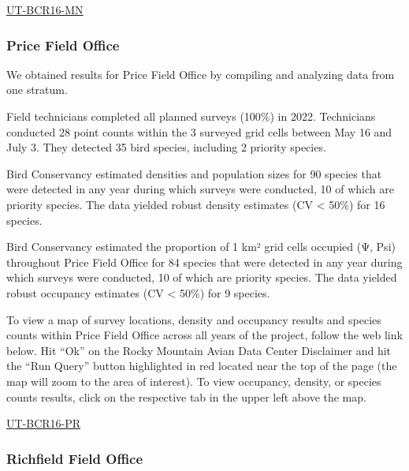 \documentclass[
  letterpaper,
  DIV=11,
  numbers=noendperiod,
  oneside]{scrreprt}
\begin{document}
\href{http://www.rmbo.org/new_site/adc/QueryWindow.aspx\#N4IgzgLgTghhCuBbEAuABCAqgFQLQCEBhAJQEYA2XAWQDl194oBTGeNAewDM0AZGAOwAmaKgJgBzJoib8IaXCPayAlgGMmAGw3s0AMWWbhAeU6c1TEAF8gA=}{UT-BCR16-MN}

\hypertarget{price-field-office}{%
\subsubsection{Price Field Office}\label{price-field-office}}

We obtained results for Price Field Office by compiling and analyzing
data from one stratum.

Field technicians completed all planned surveys (100\%) in 2022.
Technicians conducted 28 point counts within the 3 surveyed grid cells
between May 16 and July 3. They detected 35 bird species, including 2
priority species.

Bird Conservancy estimated densities and population sizes for 90 species
that were detected in any year during which surveys were conducted, 10
of which are priority species. The data yielded robust density estimates
(CV \textless{} 50\%) for 16 species.

Bird Conservancy estimated the proportion of 1 km² grid cells occupied
(Ψ, Psi) throughout Price Field Office for 84 species that were detected
in any year during which surveys were conducted, 10 of which are
priority species. The data yielded robust occupancy estimates (CV
\textless{} 50\%) for 9 species.

To view a map of survey locations, density and occupancy results and
species counts within Price Field Office across all years of the
project, follow the web link below. Hit ``Ok'' on the Rocky Mountain
Avian Data Center Disclaimer and hit the ``Run Query'' button
highlighted in red located near the top of the page (the map will zoom
to the area of interest). To view occupancy, density, or species counts
results, click on the respective tab in the upper left above the map.

\href{http://www.rmbo.org/new_site/adc/QueryWindow.aspx\#N4IgzgLgTghhCuBbEAuABCAqgFQLQCEBhAJQEYA2XABWPX3igFMZ40B7AMzQBkYA7ACZoAsvxgBzRokZ8IaXGipQAlgGNGaAGLLGAGyEB5DhzWMQAXyA}{UT-BCR16-PR}

\hypertarget{richfield-field-office}{%
\subsubsection{Richfield Field Office}\label{richfield-field-office}}
\end{document}
